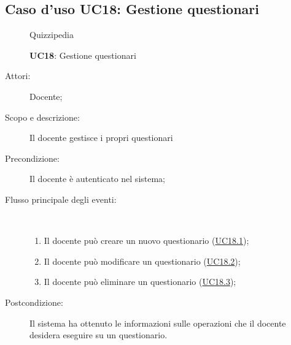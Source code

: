\subsection{Caso d'uso UC18: Gestione questionari}
\begin{figure}[H]
	\centering
	\begin{resizedtikzpicture}{\textwidth}
		\begin{umlsystem}[x=0, fill=lightgray!20]{Quizzipedia}
		\end{umlsystem}
	\end{resizedtikzpicture}
	\caption{\textbf{UC18}: Gestione questionari}
	\label{UC18}
\end{figure}
\begin{description}
	\item[Attori:] Docente;
	\item[Scopo e descrizione:] Il docente gestisce i propri questionari
	\item[Precondizione:] Il docente è autenticato nel sistema;
	
	\item[Flusso principale degli eventi:] \ 
	\begin{enumerate}
		\item Il docente può creare un nuovo questionario (\hyperlink{UC18.1}{UC18.1});
		\item Il docente può modificare un questionario (\hyperlink{UC18.2}{UC18.2});
		\item Il docente può eliminare un questionario (\hyperlink{UC18.3}{UC18.3});
		
	\end{enumerate}
	\item[Postcondizione:] Il sistema ha ottenuto le informazioni sulle operazioni che il docente desidera eseguire su un questionario.
\end{description}
\hypertarget{UC18.1}{}
